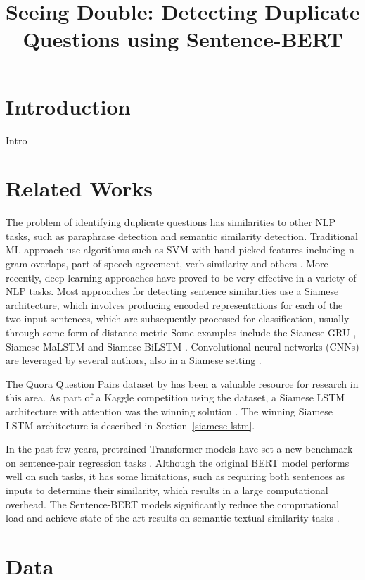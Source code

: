 \documentclass[10pt, a4paper]{article}
\title{Seeing Double: Detecting Duplicate Questions using Sentence-BERT}
\begin{document}
\maketitleabstract

\section{Introduction}

Intro

\section{Related Works}

The problem of identifying duplicate questions has similarities to other NLP tasks, such as paraphrase detection and semantic similarity detection.
Traditional ML approach use algorithms such as SVM with hand-picked features including n-gram overlaps, part-of-speech agreement, verb similarity and others \citep{dey2016paraphrase}.
More recently, deep learning approaches have proved to be very effective in a variety of NLP tasks.
Most approaches for detecting sentence similarities use a Siamese architecture, which involves producing encoded representations for each of the two input sentences, which are subsequently processed for classification, usually through some form of distance metric
Some examples include the Siamese GRU \citep{homma2016detecting}, Siamese MaLSTM \citep{imtiaz2020duplicate} and Siamese BiLSTM \citep{fradelos2023using}.
Convolutional neural networks (CNNs) are leveraged by several authors, also in a Siamese setting \citep{bogdanova2015detecting,prabowo2019duplicate}.

The Quora Question Pairs dataset by \citet{iyer2017first} has been a valuable resource for research in this area.
As part of a Kaggle competition using the dataset, a Siamese LSTM architecture with attention was the winning solution \citep{dadashov2017quora}.
The winning Siamese LSTM architecture is described in Section~\ref{siamese-lstm}.

In the past few years, pretrained Transformer models have set a new benchmark on sentence-pair regression tasks \citep{devlin2018bert}.
Although the original BERT model performs well on such tasks, it has some limitations, such as requiring both sentences as inputs to determine their similarity, which results in a large computational overhead.
The Sentence-BERT models significantly reduce the computational load and achieve state-of-the-art results on semantic textual similarity tasks \citep{reimers-2019-sentence-bert}.

\section{Data}
\end{document}
